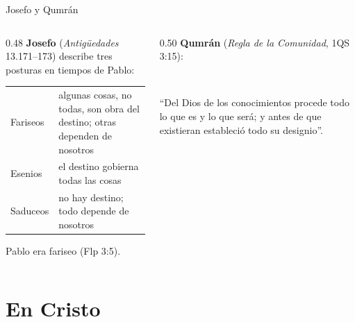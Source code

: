 \begin{frame}{Josefo y Qumrán}
\begin{columns}[t,onlytextwidth]
\begin{column}{0.48\textwidth}\small
\textbf{Josefo} (\emph{Antigüedades} 13.171--173) describe tres posturas en tiempos de Pablo:
\scriptsize\renewcommand{\arraystretch}{1.15}
\begin{tabular}{@{}>{\RaggedRight\arraybackslash}p{1.6cm}>{\RaggedRight\arraybackslash}p{3.6cm}@{}}
\toprule
Fariseos & algunas cosas, no todas, son obra del destino; otras dependen de nosotros \\
Esenios & el destino gobierna todas las cosas \\
Saduceos & no hay destino; todo depende de nosotros \\
\bottomrule
\end{tabular}\par\smallskip
\small Pablo era fariseo (Flp 3:5).
\end{column}
\begin{column}{0.50\textwidth}\small
\textbf{Qumrán} (\emph{Regla de la Comunidad}, 1QS 3:15):
\begin{center}\\ \end{center}
``Del Dios de los conocimientos procede todo lo que es y lo que será; y antes de que existieran estableció todo su designio''.
\end{column}
\end{columns}\par\smallskip
{}
\end{frame}

\section{En Cristo}

